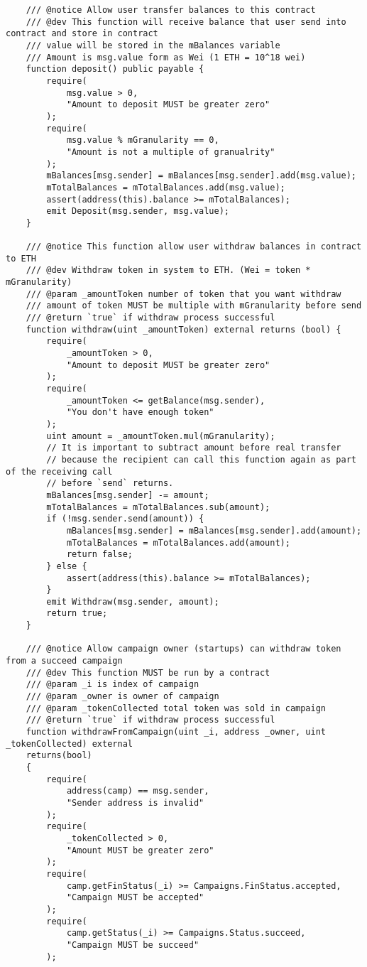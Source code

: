 \documentclass[../main-report.tex]{subfiles}
\begin{document}
\begin{lstlisting}
    /// @notice Allow user transfer balances to this contract
    /// @dev This function will receive balance that user send into contract and store in contract
    /// value will be stored in the mBalances variable
    /// Amount is msg.value form as Wei (1 ETH = 10^18 wei)
    function deposit() public payable {
        require(
            msg.value > 0,
            "Amount to deposit MUST be greater zero"
        );
        require(
            msg.value % mGranularity == 0,
            "Amount is not a multiple of granualrity"
        );
        mBalances[msg.sender] = mBalances[msg.sender].add(msg.value);
        mTotalBalances = mTotalBalances.add(msg.value);
        assert(address(this).balance >= mTotalBalances);
        emit Deposit(msg.sender, msg.value);
    }

    /// @notice This function allow user withdraw balances in contract to ETH
    /// @dev Withdraw token in system to ETH. (Wei = token * mGranularity)
    /// @param _amountToken number of token that you want withdraw
    /// amount of token MUST be multiple with mGranularity before send
    /// @return `true` if withdraw process successful
    function withdraw(uint _amountToken) external returns (bool) {
        require(
            _amountToken > 0,
            "Amount to deposit MUST be greater zero"
        );
        require(
            _amountToken <= getBalance(msg.sender),
            "You don't have enough token"
        );
        uint amount = _amountToken.mul(mGranularity);
        // It is important to subtract amount before real transfer
        // because the recipient can call this function again as part of the receiving call
        // before `send` returns.
        mBalances[msg.sender] -= amount;
        mTotalBalances = mTotalBalances.sub(amount);
        if (!msg.sender.send(amount)) {
            mBalances[msg.sender] = mBalances[msg.sender].add(amount);
            mTotalBalances = mTotalBalances.add(amount);
            return false;
        } else {
            assert(address(this).balance >= mTotalBalances);
        }
        emit Withdraw(msg.sender, amount);
        return true;
    }

    /// @notice Allow campaign owner (startups) can withdraw token from a succeed campaign
    /// @dev This function MUST be run by a contract
    /// @param _i is index of campaign
    /// @param _owner is owner of campaign
    /// @param _tokenCollected total token was sold in campaign
    /// @return `true` if withdraw process successful
    function withdrawFromCampaign(uint _i, address _owner, uint _tokenCollected) external
    returns(bool)
    {
        require(
            address(camp) == msg.sender,
            "Sender address is invalid"
        );
        require(
            _tokenCollected > 0,
            "Amount MUST be greater zero"
        );
        require(
            camp.getFinStatus(_i) >= Campaigns.FinStatus.accepted,
            "Campaign MUST be accepted"
        );
        require(
            camp.getStatus(_i) >= Campaigns.Status.succeed,
            "Campaign MUST be succeed"
        );


\end{lstlisting}
\end{document}
